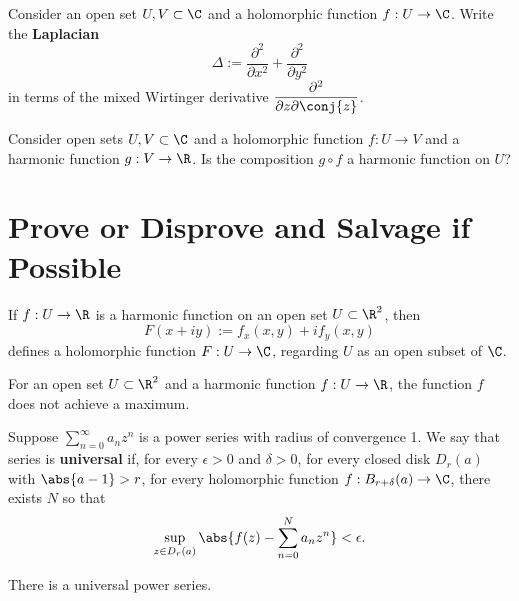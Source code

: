 \documentclass{homework}
\begin{document}
\begin{problem}\label{laplacian-via-wirtinger}Consider an open set
  $U, V \subset \C$ and a holomorphic function $f : U \to \C$.  Write
  the \textbf{Laplacian}
  \[
    \Delta := \frac{\partial^2}{\partial x^2} + \frac{\partial^2}{\partial y^2} 
  \]
  in terms of the mixed Wirtinger derivative
  $\displaystyle\frac{\partial^2}{\partial z \partial \conj{z}}$.
\end{problem}

\begin{problem}\label{composition-holomorphic-harmonic}Consider open
  sets $U, V \subset \C$ and a holomorphic function $f : U \to V$ and
  a harmonic function $g : V \to \R$.  Is the composition $g \circ f$
  a harmonic function on $U$?
\end{problem}

\section{Prove or Disprove and Salvage if Possible}

\begin{problem} %
  If $f : U \to \R$ is a harmonic function on an open set $U \subset \R^2$, then 
  \[
    F(x+iy) := f_x(x,y) + i f_y(x,y) 
  \]
  defines a holomorphic function $F : U \to \C$, regarding $U$ as an
  open subset of $\C$.
\end{problem} 

\begin{problem}\label{maximum-principle}For an open set
  $U \subset \R^2$ and a harmonic function $f : U \to \R$, the
  function $f$ does not achieve a maximum. %
\end{problem}

\begin{problem}\label{universal-taylor-series}Suppose
  $\displaystyle\sum_{n=0}^\infty a_n z^n$ is a power series with
  radius of convergence 1.  We say that series is \textbf{universal}
  if, for every $\epsilon > 0$ and $\delta > 0$, for every closed disk
  $D_r(a)$ with $\abs{a-1} > r$, for every holomorphic function
  $f : B_{r + \delta}(a) \to \C$, there exists $N$ so that
  \[
    \sup_{z \in D_r(a)} \abs{ f(z) - \sum_{n=0}^N a_n z^n } < \epsilon.
  \]

  There is a universal power series.
\end{problem}
\end{document}
